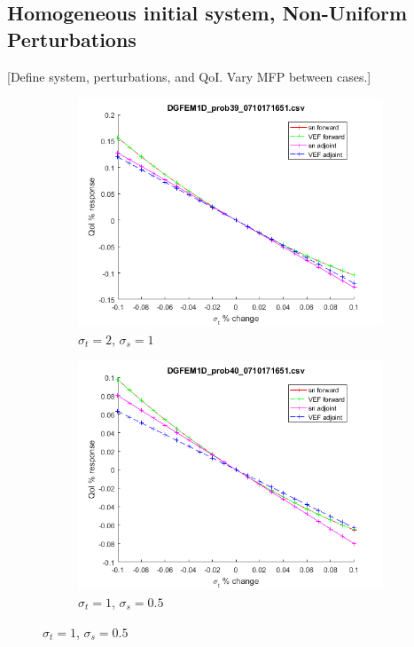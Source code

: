 \documentclass{article}
\newcommand{\sigt}{\sigma_t}
\newcommand{\sigs}{\sigma_s}
\begin{document}
\subsection{Homogeneous initial system, Non-Uniform Perturbations}

[Define system,  perturbations, and QoI. Vary MFP between cases.]
\begin{figure}[H]
\label{InHomoPertt}
\centering
\begin{subfigure}{.5\textwidth}
  \centering
  \includegraphics[width=.8\linewidth]{figures/39sigtSens.png}
  \caption{$\sigt=2$, $\sigs=1$}
  \label{fig:sfig1}
\end{subfigure}%
\begin{subfigure}{.5\textwidth}
  \centering
  \includegraphics[width=.8\linewidth]{figures/40sigtSens.png}
  \caption{$\sigt=1$, $\sigs=0.5$}
  \label{fig:sfig2}

\end{subfigure}
\end{figure}
\end{document}
